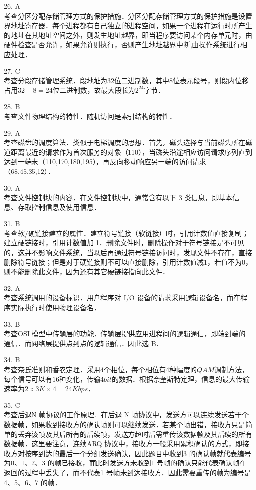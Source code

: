 26. A \\
考查分区分配存储管理方式的保护措施．分区分配存储管理方式的保护措施是设置界地址寄存器．每个进程都有自己独立的进程空间，如果一个进程在运行时所产生的地址在其地址空间之外，则发生地址越界，即当程序要访问某个内存单元时，由硬件检查是否允许，如果允许则执行，否则产生地址越界中断,由操作系统进行相应处理．

27. C \\
考查分段存储管理系统．段地址为$32$位二进制数，其中$8$位表示段号，则段内位移占用$32-8=24$位二进制数，故最大段长为$2^{24}$字节．

28. B \\
考查文件物理结构的特性．随机访问是索引结构的特性．

29. A \\
考查磁盘的调度算法．类似于电梯调度的思想．首先，磁头选择与当前磁头所在磁道距离最近的请求作为首次服务的对象（110），当磁头沿途相应访问请求序列直到达到一端末（110,170,180,195），再反向移动响应另一端的访问请求（68,45,35,12）．

30. A \\
考查文件控制块的内容．在文件控制块中，通常含有以下 3 类信息，即基本信息、存取控制信息及使用信息．

31. B \\
考查软/硬链接建立的属性．建立符号链接（软链接）时，引用计数值直接复制；建立硬链接时，引用计数值加 1．删除文件时，删除操作对于符号链接是不可见的，这并不影响文件系统，当以后再通过符号链接访问时，发现文件不存在，直接删除符号链接；但是对于硬链接则不可以直接删除，引用计数值减1，若值不为0，则不能删除此文件，因为还有其它硬链接指向此文件．

32. A \\
考查系统调用的设备标识．用户程序对 I/O 设备的请求采用逻辑设备名，而在程序实际执行时使用物理设备名．

33. B \\
考查OSI 模型中传输层的功能．传输层提供应用进程间的逻辑通信，即端到端的通信．而网络层提供点到点的逻辑通信．因此选 B．

34. B \\
考查奈氏准则和香农定理．采用$4$个相位，每个相位有$4$种幅度的$QAM$调制方法，每个信号可以有$16$种变化，传输$4bit$的数据．根据奈奎斯特定理，信息的最大传输速率为$2\times3K\times4=24Kbps$．

35. C \\
考查后退N 帧协议的工作原理．在后退 N 帧协议中，发送方可以连续发送若干个数据帧，如果收到接收方的确认帧则可以继续发送．若某个帧出错，接收方只是简单的丢弃该帧及其后所有的后续帧，发送方超时后需重传该数据帧及其后续的所有数据帧．这里要注意，连续ARQ 协议中，接收方一般采用累积确认的方式，即接收方对按序到达的最后一个分组发送确认，因此题目中收到3 的确认帧就代表编号为0、1、2、3 的帧已接收，而此时发送方未收到1 号帧的确认只能代表确认帧在返回的过程中丢失了，而不代表1 号帧未到达接收方．因此需要重传的帧为编号是4、5、6、7 的帧．

